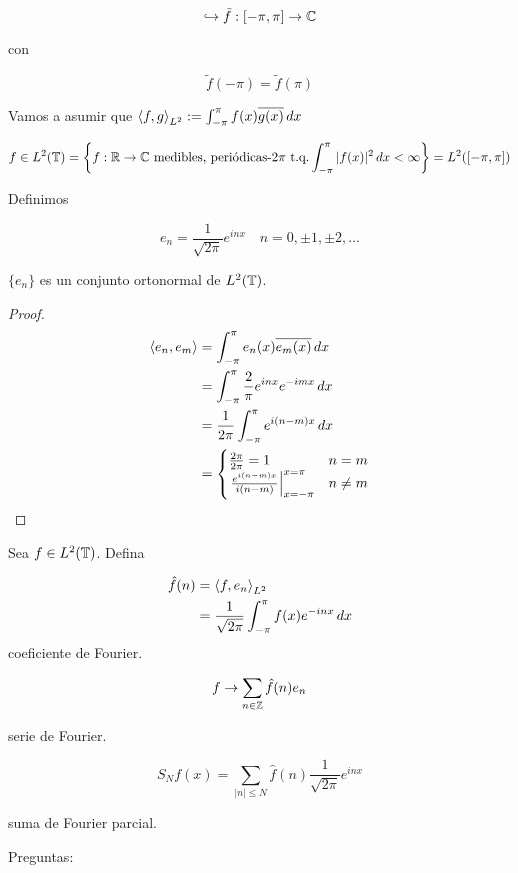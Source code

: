 \[\hookrightarrow \tilde f:[-\pi,\pi]\to\mathbb{C}\]

con

\[\tilde f(-\pi)=\tilde f(\pi)\]

Vamos a asumir que $\left\langle f,g\right\rangle_{L^2}:=\int_{-\pi}^\pi f(x)\overline{g(x)}\,dx$

\[f\in L^2(\mathbb{T})=\left\{f:\mathbb{R}\to\mathbb{C}\text{ medibles, periódicas-$2\pi$ t.q.} \int_{-\pi}^\pi |f(x)|^2\,dx<\infty\right\}=L^2([-\pi,\pi])\]

Definimos 

\[e_n=\frac{1}{\sqrt{2\pi}}e^{inx}\quad n=0,\pm 1,\pm 2,\ldots\]

\begin{fproposition}
    $\{e_n\}$ es un conjunto ortonormal de $L^2(\mathbb{T})$.
\end{fproposition}

\begin{proof}
    \begin{align*}
        \left\langle e_n,e_m\right\rangle&=\int_{-\pi}^\pi e_n(x)\overline{e_m(x)}\,dx\\
        &=\int_{-\pi}^\pi \frac{2}{\pi} e^{inx}e^{-imx}\,dx\\
        &=\frac{1}{2\pi}\int_{-\pi}^\pi e^{i(n-m)x}\,dx\\
        &=\begin{cases}
            \frac{2\pi}{2\pi}=1&n=m\\
            \left.\frac{e^{i(n-m)x}}{i(n-m)}\right|_{x=-\pi}^{x=\pi}&n\neq m
        \end{cases}
    \end{align*}
\end{proof}

\begin{fdefinition}
    Sea $f\in L^2(\mathbb{T})$. Defina 
    
    \begin{align*}
        \hat f (n)&=\left\langle f,e_n\right\rangle_{L^2}\\
        &=\frac{1}{\sqrt{2\pi}}\int_{-\pi}^\pi f(x) e^{-inx}\,dx
    \end{align*}
    coeficiente de Fourier.

    \[f\to \sum_{n\in\mathbb{Z}}\hat f(n)e_n\]

    serie de Fourier.
\end{fdefinition}

\[S_N f(x)=\sum_{|n|\leq N} \hat f(n)\frac{1}{\sqrt{2\pi}} e^{inx}\]

suma de Fourier parcial.

Preguntas:

